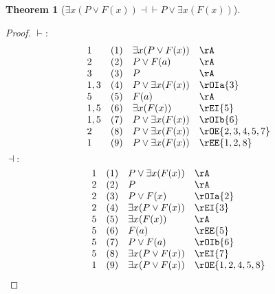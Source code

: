 \documentclass{book}
\theoremstyle{plain}
\newtheorem{theorem}{Theorem}
\theoremstyle{remark}
\theoremstyle{definition}
\begin{document}
\label{ExxLpPOrFLpxRpRpEqvPOrExxLpFLpxRpRp}
\begin{theorem}[\(\exists x(P \lor F(x)) \dashv \vdash P \lor \exists x(F(x))\)]
\end{theorem}
\begin{proof}
	\(\vdash:\)
	\[
	\begin{array}{llll}
		1 & (1) & \exists x(P \lor F(x)) & \rA \\
		2 & (2) & P \lor F(a) & \rA \\
		3 & (3) & P & \rA \\
		1,3 & (4) & P \lor \exists x(F(x)) & \rOIa{3} \\
		5 & (5) & F(a) & \rA \\
		1,5 & (6) & \exists x(F(x)) & \rEI{5} \\
		1,5 & (7) & P \lor \exists x(F(x)) & \rOIb{6} \\
		2 & (8) & P \lor \exists x(F(x)) & \rOE{2,3,4,5,7} \\
		1 & (9) & P \lor \exists x(F(x)) & \rEE{1,2,8} \\
	\end{array}
	\]
	\(\dashv:\)
	\[
	\begin{array}{llll}
		1 & (1) & P \lor \exists x(F(x)) & \rA \\
		2 & (2) & P & \rA \\
		2 & (3) & P\lor F(x) & \rOIa{2} \\
		2 & (4) & \exists x(P \lor F(x)) & \rEI{3} \\
		5 & (5) & \exists x(F(x)) & \rA \\
		5 & (6) & F(a) & \rEE{5} \\
		5 & (7) & P \lor F(a) & \rOIb{6} \\
		5 & (8) & \exists x(P \lor F(x)) & \rEI{7} \\
		1 & (9) & \exists x(P \lor F(x)) & \rOE{1,2,4,5,8} \\
	\end{array}
	\]
\end{proof}
\end{document}
